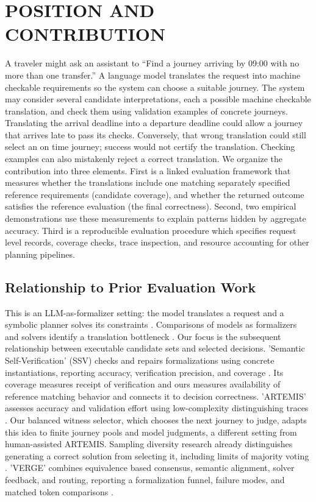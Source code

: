 \documentclass[a4paper,twoside]{article}
\begin{document}
\section{\uppercase{Position and Contribution}}
\label{sec:position}
\noindent A traveler might ask an assistant to ``Find a journey arriving by 09:00 with no more than one transfer.'' A language model translates the request into machine checkable requirements so the system can choose a suitable journey.
The system may consider several candidate interpretations, each a possible machine checkable translation, and check them using validation examples of concrete journeys. Translating the arrival deadline into a departure deadline could allow a journey that arrives late to pass its checks. Conversely, that wrong translation could still select an on time journey; success would not certify the translation. Checking examples can also mistakenly reject a correct translation. 
We organize the contribution into three elements.
First is a linked evaluation framework that measures whether the translations include one matching separately specified reference requirements (candidate coverage), and whether the returned outcome satisfies the reference evaluation (the final correctness).
Second, two empirical demonstrations use these measurements to explain patterns hidden by aggregate accuracy.
Third is a reproducible evaluation procedure which specifies request level records, coverage checks, trace inspection, and resource accounting for other planning pipelines.


\subsection{Relationship to Prior Evaluation Work}

This is an LLM-as-formalizer setting: the model translates a request and a symbolic planner solves its constraints \cite{tantakoun}. Comparisons of models as formalizers and solvers identify a translation bottleneck \cite{amonkar}. Our focus is the subsequent relationship between executable candidate sets and selected decisions.
'Semantic Self-Verification' (SSV) checks and repairs formalizations using concrete instantiations, reporting accuracy, verification precision, and coverage \cite{ssv}. Its coverage measures receipt of verification and ours measures availability of reference matching behavior and connects it to decision correctness.
'ARTEMIS' assesses accuracy and validation effort using low-complexity distinguishing traces \cite{artemis}. Our balanced witness selector, which chooses the next journey to judge, adapts this idea to finite journey pools and model judgments, a different setting from human-assisted ARTEMIS.
Sampling diversity research already distinguishes generating a correct solution from selecting it, including limits of majority voting \cite{diversity}. 
'VERGE' combines equivalence based consensus, semantic alignment, solver feedback, and routing, reporting a formalization funnel, failure modes, and matched token comparisons \cite{verge}. 
\end{document}
